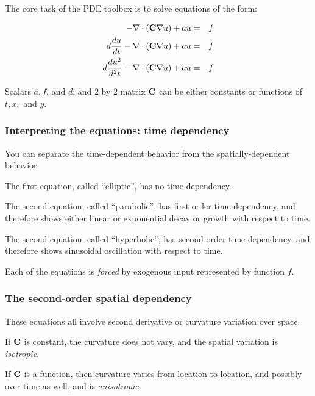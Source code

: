 \documentclass[11pt]{beamer}
\begin{document}
\begin{frame}

The core task of the PDE toolbox is to solve equations of the
form:

\begin{eqnarray}
  -\nabla \cdot (\mbox{\bf C} \nabla u) + a u & = & f
  \nonumber \\
  d \frac{du}{dt} -\nabla \cdot (\mbox{\bf C} \nabla u) + a u & = & f
  \nonumber \\
  d \frac{du^2}{d^2t} -\nabla \cdot (\mbox{\bf C} \nabla u) + a u & = & f
  \nonumber \\
\end{eqnarray}

Scalars $a, f$, and $d$; and 2 by 2 matrix $\mbox{\bf C}$ can be either
constants or functions of $t, x,$ and $y$.

\end{frame}


\begin{frame}

\frametitle{Interpreting the equations: time dependency}

\bi
  \item You can separate the time-dependent behavior from the
  spatially-dependent behavior.
  \item The first equation, called ``elliptic'', has no
  time-dependency.
  \item The second equation, called ``parabolic'', has first-order
  time-dependency, and therefore shows either linear or exponential
  decay or growth with respect to time.
  \item The second equation, called ``hyperbolic'', has second-order
  time-dependency, and therefore shows sinusoidal oscillation
  with respect to time.
  \item Each of the equations is \emph{forced} by exogenous input
  represented by function $f$.
\ei

\end{frame}


\begin{frame}


\frametitle{The second-order spatial dependency}

\bi
  \item These equations all involve second derivative or curvature
  variation over space.
  \item If $\mbox{\bf C}$ is constant, the curvature does not vary, and
  the spatial variation is \emph{isotropic}.
  \item If $\mbox{\bf C}$ is a function, then curvature varies from
  location to location, and possibly over time as well, and is
  \emph{anisotropic}.
\ei

\end{frame}
\end{document}
